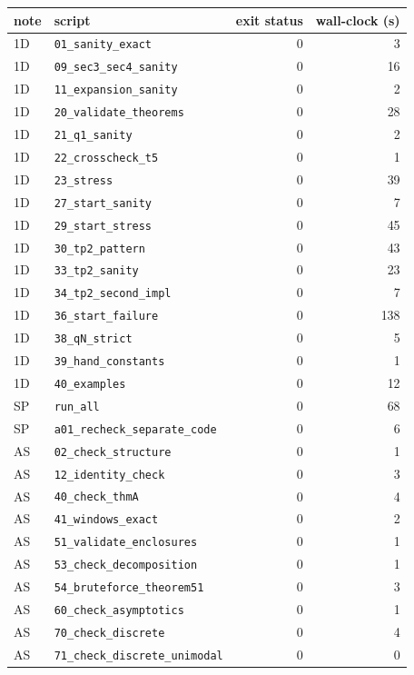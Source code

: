 \documentclass[10pt,a4paper]{article}
\theoremstyle{plain}
\theoremstyle{definition}
\newcommand{\ONE}{\textsf{1D}}
\newcommand{\SPE}{\textsf{SP}}
\newcommand{\ASY}{\textsf{AS}}
\begin{document}
\begin{center}\small
\begin{longtable}{llrr}
\toprule
note & script & exit status & wall-clock (s)\\
\midrule
\endhead
\ONE & \texttt{01\_sanity\_exact} & 0 & 3\\
\ONE & \texttt{09\_sec3\_sec4\_sanity} & 0 & 16\\
\ONE & \texttt{11\_expansion\_sanity} & 0 & 2\\
\ONE & \texttt{20\_validate\_theorems} & 0 & 28\\
\ONE & \texttt{21\_q1\_sanity} & 0 & 2\\
\ONE & \texttt{22\_crosscheck\_t5} & 0 & 1\\
\ONE & \texttt{23\_stress} & 0 & 39\\
\ONE & \texttt{27\_start\_sanity} & 0 & 7\\
\ONE & \texttt{29\_start\_stress} & 0 & 45\\
\ONE & \texttt{30\_tp2\_pattern} & 0 & 43\\
\ONE & \texttt{33\_tp2\_sanity} & 0 & 23\\
\ONE & \texttt{34\_tp2\_second\_impl} & 0 & 7\\
\ONE & \texttt{36\_start\_failure} & 0 & 138\\
\ONE & \texttt{38\_qN\_strict} & 0 & 5\\
\ONE & \texttt{39\_hand\_constants} & 0 & 1\\
\ONE & \texttt{40\_examples} & 0 & 12\\
\SPE & \texttt{run\_all} & 0 & 68\\
\SPE & \texttt{a01\_recheck\_separate\_code} & 0 & 6\\
\ASY & \texttt{02\_check\_structure} & 0 & 1\\
\ASY & \texttt{12\_identity\_check} & 0 & 3\\
\ASY & \texttt{40\_check\_thmA} & 0 & 4\\
\ASY & \texttt{41\_windows\_exact} & 0 & 2\\
\ASY & \texttt{51\_validate\_enclosures} & 0 & 1\\
\ASY & \texttt{53\_check\_decomposition} & 0 & 1\\
\ASY & \texttt{54\_bruteforce\_theorem51} & 0 & 3\\
\ASY & \texttt{60\_check\_asymptotics} & 0 & 1\\
\ASY & \texttt{70\_check\_discrete} & 0 & 4\\
\ASY & \texttt{71\_check\_discrete\_unimodal} & 0 & 0\\

\end{longtable}
\end{center}
\end{document}
